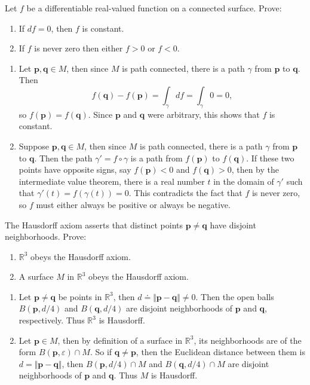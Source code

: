\documentclass[10pt]{report}
\begin{document}
\begin{exer}[4.7: 4]
Let $f$ be a differentiable real-valued function on a connected surface. Prove:
\begin{enumerate}
	\item If $df=0$, then $f$ is constant.
	\item If $f$ is never zero then either $f>0$ or $f<0$.
\end{enumerate}
\end{exer}
\begin{enumerate}
	\item Let $\mathbf{p},\mathbf{q} \in M$, then since $M$ is path connected, there is a path $\gamma$ from $\mathbf{p}$ to $\mathbf{q}$. Then
		\[
			f(\mathbf{q})-f(\mathbf{p})= \int_{\gamma} df = \int_{\gamma} 0 = 0,
		\] so $f(\mathbf{p}) = f(\mathbf{q})$. Since $\mathbf{p}$ and $\mathbf{q}$ were arbitrary, this shows that $f$ is constant.
	\item Suppose $\mathbf{p},\mathbf{q} \in M$, then since $M$ is path connected, there is a path $\gamma$ from $\mathbf{p}$ to $\mathbf{q}$. Then the path $\gamma' = f \circ \gamma$ is a path from $f(\mathbf{p})$ to $f(\mathbf{q})$. If these two points have opposite signs, say $f(\mathbf{p}) < 0$ and $f(\mathbf{q}) > 0$, then by the intermediate value theorem, there is a real number $t$ in the domain of $\gamma'$ such that $\gamma'(t) = f(\gamma(t)) = 0$. This contradicts the fact that $f$ is never zero, so $f$ must either always be positive or always be negative.
\end{enumerate}

\begin{exer}[4.7: 10]
The Hausdorff axiom asserts that distinct points $\mathbf{p}\neq \mathbf{q}$ have disjoint neighborhoods. Prove:
\begin{enumerate}
	\item $\mathbb{R}^3$ obeys the Hausdorff axiom.
	\item A surface $M$ in $\mathbb{R}^3$ obeys the Hausdorff axiom.
\end{enumerate}
\end{exer}
\begin{enumerate}
	\item Let $\mathbf{p} \neq \mathbf{q}$ be points in $\mathbb{R}^3$, then $d \doteq {\Vert{\mathbf{p}-\mathbf{q}}\Vert} \neq 0$. Then the open balls $B(\mathbf{p},d/4)$ and $B(\mathbf{q},d/4)$ are disjoint neighborhoods of $\mathbf{p}$ and $\mathbf{q}$, respectively. Thus $\mathbb{R}^3$ is Hausdorff.
	\item Let $\mathbf{p} \in M$, then by definition of a surface in $\mathbb{R}^3$, its neighborhoods are of the form $B(\mathbf{p},\varepsilon) \cap M$. So if $\mathbf{q} \neq \mathbf{p}$, then the Euclidean distance between them is $d = {\Vert{\mathbf{p}-\mathbf{q}}\Vert}$, then $B(\mathbf{p}, d/4) \cap M$ and $B(\mathbf{q},d/4) \cap M$ are disjoint neighborhoods of $\mathbf{p}$ and $\mathbf{q}$. Thus $M$ is Hausdorff.
\end{enumerate}
\end{document}
